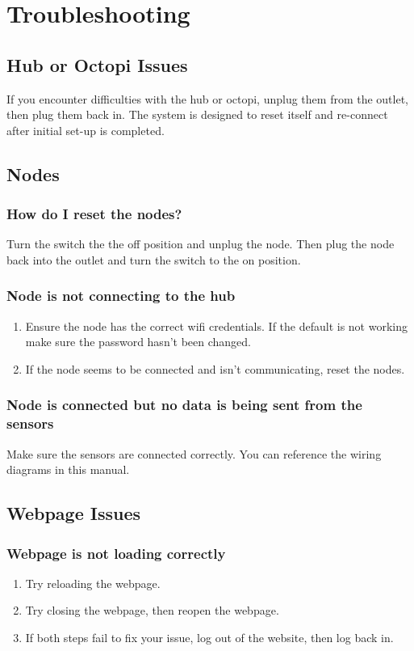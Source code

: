   \section{Troubleshooting}
  \subsection{Hub or Octopi Issues}
	If you encounter difficulties with the hub or octopi, unplug them 
	from the outlet, then
       plug them back in.  The system is designed to reset itself and re-connect
       after initial set-up is completed.
  \subsection{Nodes}
  \subsubsection{How do I reset the nodes?}
     Turn the switch the the off position and unplug the node. Then plug the node back into the outlet
  and turn the switch to the on position.
  \subsubsection{Node is not connecting to the hub}
  \begin{enumerate}
    \item Ensure the node has the correct wifi credentials. If the default is not
    working make sure the password hasn't been changed.
    \item If the node seems to be connected and isn't communicating, reset the nodes.
  \end{enumerate}
  \subsubsection{Node is connected but no data is being sent from the sensors}
      Make sure the sensors are connected correctly. You can reference the wiring diagrams
     in this manual.

  \subsection{Webpage Issues}
  \subsubsection{Webpage is not loading correctly}
  \begin{enumerate}
    \item Try reloading the webpage.
    \item Try closing the webpage, then reopen the webpage.
    \item If both steps fail to fix your issue, log out of the website, then log back in.
  \end{enumerate}

